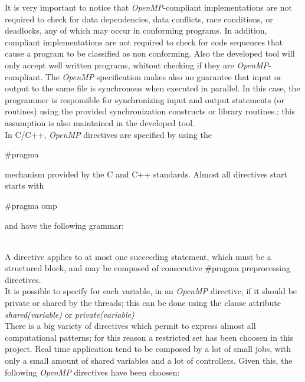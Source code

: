 \documentclass[a4paper,11pt,oneside]{book}
\begin{document}
It is very important to notice that \emph{OpenMP}-compliant implementations are not required to check for data dependencies, data conflicts, race conditions, or deadlocks, any of which may occur in conforming programs. In addition, compliant implementations are not required to check for code sequences that cause a program to be classified as non conforming. Also the developed tool will only accept well written programs, whitout checking if they are \emph{OpenMP}-compliant. The \emph{OpenMP} specification makes also no guarantee that input or output to the same file is synchronous when executed in parallel. In this case, the programmer is responsible for synchronizing input and output statements (or routines) using the provided synchronization constructs or library routines.; this assumption is also maintained in the developed tool.
\\
In C/C++, \emph{OpenMP} directives are specified by using the\begin{bf} $\#$pragma\end{bf} mechanism provided by the C and C++ standards.  Almost all directives start starts with \begin{bf}$\#$pragma omp\end{bf} and have the following grammar:
\begin{bf}{}\end{bf}
\\
A directive applies to at most one succeeding statement, which must be a structured block, and may be composed of consecutive $\#$pragma preprocessing directives. \\
It is possible to specify for each variable, in an \emph{OpenMP} directive, if it should be private or shared by the threads; this can be done using the clause attribute \emph{shared(variable)} or \emph{private(variable)}\\
There is a big variety of  directives which permit to express almost all computational patterns; for this reason a restricted set has been choosen in this project. Real time application tend to be composed by a lot of small jobs, with only a small amount of shared variables and a lot of controllers. Given this, the following \emph{OpenMP} directives have been choosen:
\end{document}
